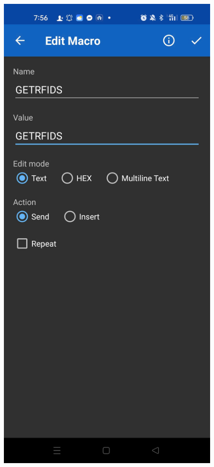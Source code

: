 \documentclass[conference, onecolumn]{IEEEtran}
\begin{document}
\begin{figure}[H]
	\centering
	\begin{minipage}[b]{0.3\textwidth}
		\centering
		\includegraphics[width=\textwidth]{z6844982585045_becf1e59918c0ba439144229f75b5192.jpg}

\end{minipage}
\end{figure}
\end{document}
